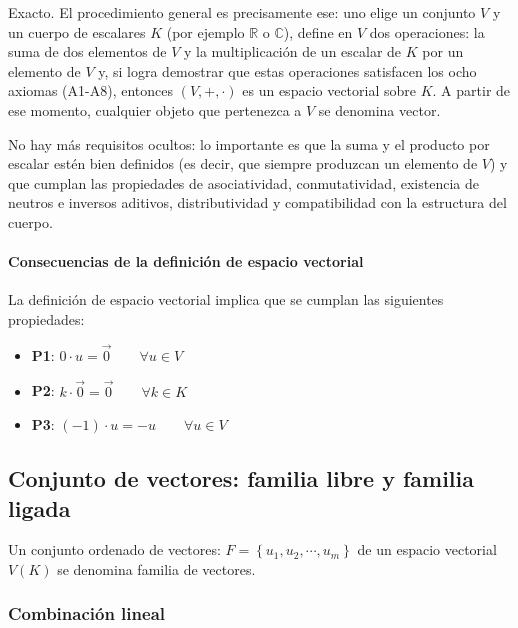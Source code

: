 \begin{tcolorbox}[interesting_data, title=¿Puedo crear un conjunto cualquiera y verificar si es un espacio vectorial?]
  Exacto. El procedimiento general es precisamente ese: uno elige un conjunto \(V\) y un cuerpo de escalares \(K\) (por ejemplo \(\mathbb{R}\) o \(\mathbb{C}\)), define en \(V\) dos operaciones: la suma de dos elementos de \(V\) y la multiplicación de un escalar de \(K\) por un elemento de \(V\) y, si logra demostrar que estas operaciones satisfacen los ocho axiomas (A1-A8), entonces \((V,+,\cdot)\) es un espacio vectorial sobre \(K\). A partir de ese momento, cualquier objeto que pertenezca a \(V\) se denomina vector.

  No hay más requisitos ocultos: lo importante es que la suma y el producto por escalar estén bien definidos (es decir, que siempre produzcan un elemento de \(V\)) y que cumplan las propiedades de asociatividad, conmutatividad, existencia de neutros e inversos aditivos, distributividad y compatibilidad con la estructura del cuerpo.
\end{tcolorbox}

\paragraph{Consecuencias de la definición de espacio vectorial}

La definición de espacio vectorial implica que se cumplan las siguientes propiedades:
\begin{itemize}
  \item \textbf{P1}: \(0\cdot u = \vec{0} \qquad \forall u \in V\)
  \item \textbf{P2}: \(k \cdot \vec{0} = \vec{0} \qquad \forall k \in K\)
  \item \textbf{P3}: \((-1) \cdot u = -u \qquad \forall u \in V\)
\end{itemize}

\subsection{Conjunto de vectores: familia libre y familia ligada}

Un conjunto ordenado de vectores: \(F = \left\{u_1,u_2,\cdots,u_m\right\}\) de un espacio vectorial \(V(K)\) se denomina familia de vectores.

\subsubsection{Combinación lineal}

